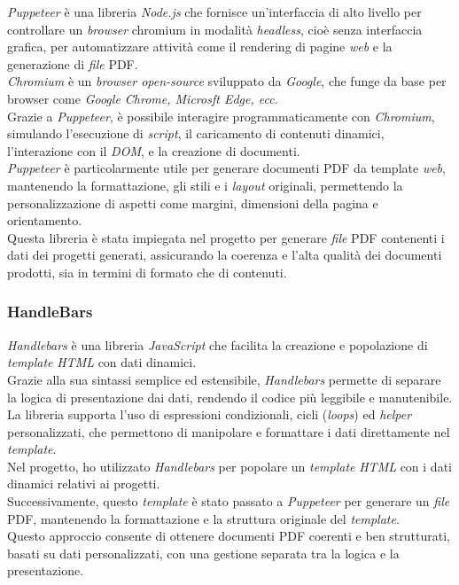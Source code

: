 \textit{Puppeteer} è una libreria \textit{Node.js} che fornisce un'interfaccia di alto livello per controllare un \textit{browser} \gls{chromium} in modalità \textit{headless}, cioè senza interfaccia grafica, per automatizzare attività come il rendering di pagine \textit{web} e la generazione di \textit{file} PDF.\\
\textit{Chromium} è un \textit{browser open-source} sviluppato da \textit{Google}, che funge da base per browser come \textit{Google Chrome, Microsft Edge, ecc.}\\

\noindent Grazie a \textit{Puppeteer}, è possibile interagire programmaticamente con \textit{Chromium}, simulando l'esecuzione di \textit{script}, il caricamento di contenuti dinamici, l'interazione con il \textit{DOM}, e la creazione di documenti.\\

\noindent \textit{Puppeteer} è particolarmente utile per generare documenti PDF da template \textit{web}, mantenendo la formattazione, gli stili e i \textit{layout} originali, permettendo la personalizzazione di aspetti come margini, dimensioni della pagina e orientamento.\\
Questa libreria è stata impiegata nel progetto per generare \textit{file} PDF contenenti i dati dei progetti generati, assicurando la coerenza e l'alta qualità dei documenti prodotti, sia in termini di formato che di contenuti.

\subsubsection{HandleBars}

\textit{Handlebars} è una libreria \textit{JavaScript} che facilita la creazione e popolazione di \textit{template} \textit{HTML} con dati dinamici.\\
Grazie alla sua sintassi semplice ed estensibile, \textit{Handlebars} permette di separare la logica di presentazione dai dati, rendendo il codice più leggibile e manutenibile. \\
La libreria supporta l'uso di espressioni condizionali, cicli (\textit{loops}) ed \textit{helper} personalizzati, che permettono di manipolare e formattare i dati direttamente nel \textit{template}.\\

\pagebreak
\noindent Nel progetto, ho utilizzato \textit{Handlebars} per popolare un \textit{template} \textit{HTML} con i dati dinamici relativi ai progetti. \\
Successivamente, questo \textit{template} è stato passato a \textit{Puppeteer} per generare un \textit{file} PDF, mantenendo la formattazione e la struttura originale del \textit{template}.\\
Questo approccio consente di ottenere documenti PDF coerenti e ben strutturati, basati su dati personalizzati, con una gestione separata tra la logica e la presentazione.

